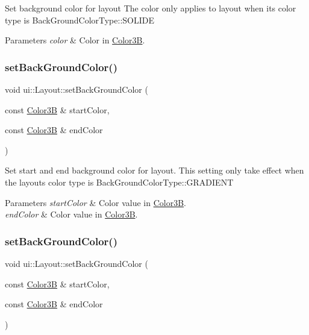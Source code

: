 Set background color for layout The color only applies to layout when it\textquotesingle{}s color type is Back\+Ground\+Color\+Type\+::\+S\+O\+L\+I\+DE


\begin{DoxyParams}{Parameters}
{\em color} & Color in \hyperlink{structColor3B}{Color3B}. \\
\hline
\end{DoxyParams}
\mbox{\label{classui_1_1Layout_abaeae43e1b5c726e0d5942f35042489a}} 
\subsubsection{\texorpdfstring{set\+Back\+Ground\+Color()}{setBackGroundColor()}\hspace{0.1cm}{\footnotesize\ttfamily [3/4]}}
{\footnotesize\ttfamily void ui\+::\+Layout\+::set\+Back\+Ground\+Color (\begin{DoxyParamCaption}\item[{const \hyperlink{structColor3B}{Color3B} \&}]{start\+Color,  }\item[{const \hyperlink{structColor3B}{Color3B} \&}]{end\+Color }\end{DoxyParamCaption})}

Set start and end background color for layout. This setting only take effect when the layout\textquotesingle{}s color type is Back\+Ground\+Color\+Type\+::\+G\+R\+A\+D\+I\+E\+NT


\begin{DoxyParams}{Parameters}
{\em start\+Color} & Color value in \hyperlink{structColor3B}{Color3B}. \\
\hline
{\em end\+Color} & Color value in \hyperlink{structColor3B}{Color3B}. \\
\hline
\end{DoxyParams}
\mbox{\label{classui_1_1Layout_abaeae43e1b5c726e0d5942f35042489a}} 
\subsubsection{\texorpdfstring{set\+Back\+Ground\+Color()}{setBackGroundColor()}\hspace{0.1cm}{\footnotesize\ttfamily [4/4]}}
{\footnotesize\ttfamily void ui\+::\+Layout\+::set\+Back\+Ground\+Color (\begin{DoxyParamCaption}\item[{const \hyperlink{structColor3B}{Color3B} \&}]{start\+Color,  }\item[{const \hyperlink{structColor3B}{Color3B} \&}]{end\+Color }\end{DoxyParamCaption})}

